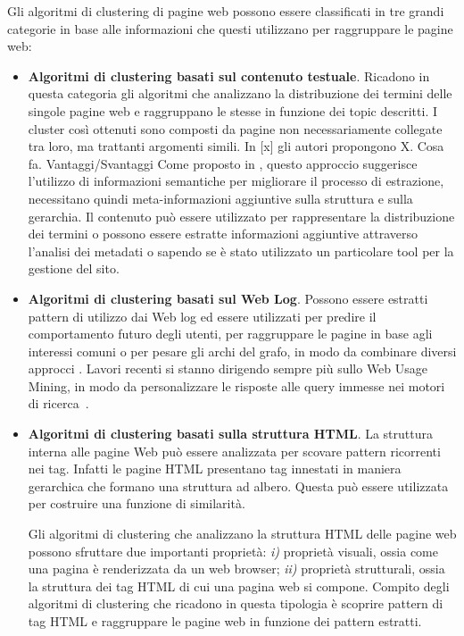 Gli algoritmi di clustering di pagine web possono essere classificati in tre grandi categorie in base alle informazioni che questi utilizzano per raggruppare le pagine web:

\begin{itemize}
\item \textbf{Algoritmi di clustering basati sul contenuto testuale}. Ricadono in questa categoria gli algoritmi che analizzano la distribuzione dei termini delle singole pagine web e raggruppano le stesse in funzione dei topic descritti. I cluster così ottenuti sono composti da pagine non necessariamente collegate tra loro, ma trattanti  argomenti simili. 
\color{red}
In [x] gli autori propongono X. Cosa fa. Vantaggi/Svantaggi
\color{green}
Come proposto in \cite{Cooley03}, questo approccio suggerisce l'utilizzo di informazioni semantiche per migliorare il processo di estrazione, necessitano quindi meta-informazioni aggiuntive sulla struttura e sulla gerarchia. Il contenuto può essere utilizzato per rappresentare la distribuzione dei termini o possono essere estratte informazioni aggiuntive attraverso l'analisi dei metadati o sapendo se è stato utilizzato un particolare tool per la gestione del sito.
\color{black}

\item \textbf{Algoritmi di clustering basati sul Web Log}. \color{red} Possono essere estratti pattern di utilizzo dai Web log ed essere utilizzati per predire il comportamento futuro degli utenti, per raggruppare le pagine in base agli interessi comuni o per pesare gli archi del grafo, in modo da combinare diversi approcci \cite{Shahabi97}. Lavori recenti si stanno dirigendo sempre più sullo Web Usage Mining, in modo da personalizzare le risposte alle query immesse nei motori di ricerca~\cite{Crabtree06}.
\color{black}
\item \textbf{Algoritmi di clustering basati sulla struttura HTML}.\color{red}
La struttura interna alle pagine Web può essere analizzata per scovare pattern ricorrenti nei tag. Infatti le pagine HTML presentano tag innestati in maniera gerarchica che formano una struttura ad albero. Questa può essere utilizzata per costruire una funzione di similarità. 

 Gli algoritmi di clustering che analizzano la struttura HTML delle pagine web possono sfruttare due importanti proprietà: \textit{i) } proprietà visuali, ossia come una pagina è renderizzata da un web browser; \textit{ii) } proprietà strutturali, ossia la struttura dei tag HTML di cui una pagina web si compone. Compito degli algoritmi di clustering che ricadono in questa tipologia è  scoprire pattern di tag HTML e raggruppare le pagine web in funzione dei pattern estratti.


\end{itemize}
